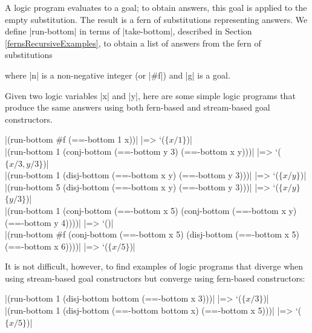 \schemedisplayspace
{}

A logic program evaluates to a goal; to obtain answers, this goal is
applied to the empty substitution. The result is a fern of
substitutions representing answers.  We define \scheme|run-bottom| in terms
of \scheme|take-bottom|, described in Section \ref{fernsRecursiveExamples}, to
obtain a list of answers from the fern of substitutions

\schemedisplayspace
{}
\noindent where \scheme|n| is a non-negative integer (or \scheme|#f|) and 
\scheme|g| is a goal.  

Given two logic variables \scheme|x| and \scheme|y|, here are
some simple logic programs that produce the same answers using both
fern-based and stream-based goal constructors.

\medskip

\indent \scheme|(run-bottom #f (==-bottom 1 x))| \schemeresult|=> `($\{x/1\}$)| \\
\indent \scheme|(run-bottom 1 (conj-bottom (==-bottom y 3) (==-bottom x y)))| %
\schemeresult|=> `($\{x/3, y/3\}$)| \\
\indent \scheme|(run-bottom 1 (disj-bottom (==-bottom x y) (==-bottom y 3)))| %
\schemeresult|=> `($\{x/y\}$)| \\
 \indent \scheme|(run-bottom 5 (disj-bottom (==-bottom x y) (==-bottom y 3)))| %
\schemeresult|=> `($\{x/y\}$ $\{y/3\}$)| \\
 \indent \scheme|(run-bottom 1 (conj-bottom (==-bottom x 5) (conj-bottom (==-bottom x y) (==-bottom y 4))))|
\schemeresult|=> `()| \\
\indent \scheme|(run-bottom #f (conj-bottom (==-bottom x 5) (disj-bottom (==-bottom x 5) (==-bottom x 6))))|
\schemeresult|=> `($\{x/5\}$)|

\medskip

\noindent It is not difficult, however, to find examples of logic
programs that diverge when using stream-based goal constructors but
converge using fern-based constructors:

\medskip

\scheme|(run-bottom 1 (disj-bottom bottom (==-bottom x 3)))| \schemeresult|=> `($\{x/3\}$)| \\
\indent \scheme|(run-bottom 1 (disj-bottom (==-bottom bottom x) (==-bottom x 5)))| \schemeresult|=> `($\{x/5\}$)|

\medskip

